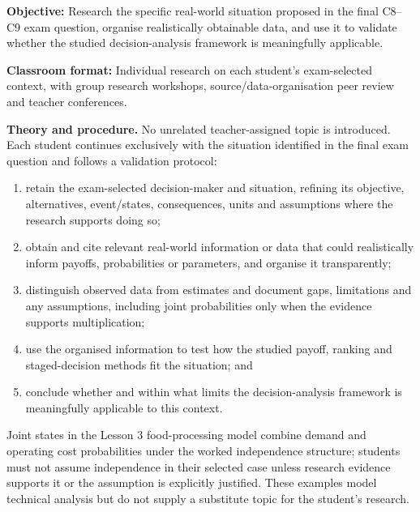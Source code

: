 \documentclass[10pt,letterpaper]{article}
\newcommand{\labelled}[2]{\textbf{#1:} #2\par}
\newcommand{\partheading}[1]{\Needspace{6\baselineskip}\par\vspace{5pt}{\bfseries #1\par}\vspace{1pt}}
\begin{document}
\begin{bluebox}
		\partheading{Part 3---C10: Validate a Student-Selected Real-World Application}
		\labelled{Objective}{Research the specific real-world situation proposed in the final C8--C9 exam question, organise realistically obtainable data, and use it to validate whether the studied decision-analysis framework is meaningfully applicable.}
		\labelled{Classroom format}{Individual research on each student's exam-selected context, with group research workshops, source/data-organisation peer review and teacher conferences.}
		\textbf{Theory and procedure.} No unrelated teacher-assigned topic is
		introduced. Each student continues exclusively with the situation identified
		in the final exam question and follows a validation protocol:
		\begin{enumerate}[leftmargin=2em,itemsep=1pt]
			\item retain the exam-selected decision-maker and situation, refining its objective, alternatives, event/states, consequences, units and assumptions where the research supports doing so;
			\item obtain and cite relevant real-world information or data that could realistically inform payoffs, probabilities or parameters, and organise it transparently;
			\item distinguish observed data from estimates and document gaps, limitations and any assumptions, including joint probabilities only when the evidence supports multiplication;
			\item use the organised information to test how the studied payoff, ranking and staged-decision methods fit the situation; and
			\item conclude whether and within what limits the decision-analysis framework is meaningfully applicable to this context.
		\end{enumerate}
		Joint states in the Lesson 3 food-processing model combine demand and operating
		cost probabilities under the worked independence structure; students must not
		assume independence in their selected case unless research evidence supports
		it or the assumption is explicitly justified. These examples model technical
		analysis but do not supply a substitute topic for the student's research.
		

\end{bluebox}
\end{document}

